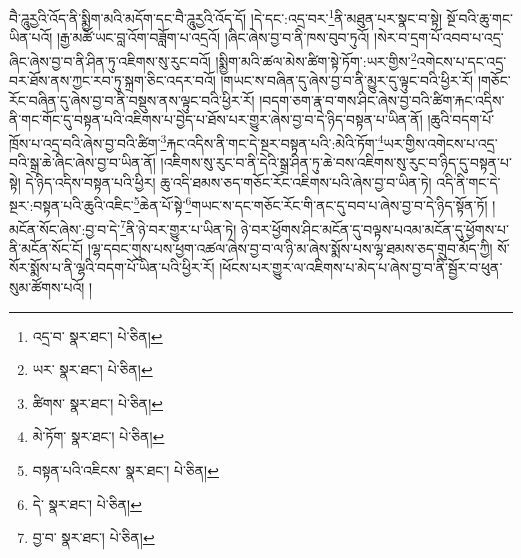 བཻ་ཌཱུརྱའི་འོད་ནི་སྨྱིག་མའི་མདོག་དང་བཻ་ཌཱུརྱའི་འོད་དོ། །དེ་དང་:འདྲ་བར་\footnote{འདྲ་བ་  སྣར་ཐང་།  པེ་ཅིན། }ནི་མཐུན་པར་སྣང་བ་སྟེ། སྔོ་བའི་ཆུ་གང་ཡིན་པའོ། །རྒྱ་མཚོ་ཡང་བླ་འོག་བཟློག་པ་འདྲའོ། །ཞིང་ཞེས་བྱ་བ་ནི་ཁས་བུབ་ཏུའོ། །སེར་བ་དྲག་པོ་འབབ་པ་འདྲ་ཞིང་ཞེས་བྱ་བ་ནི་ཤིན་ཏུ་འཇིགས་སུ་རུང་བའོ། །སྨྱིག་མའི་ཚལ་མེས་ཚིག་སྟེ་ཏོག་:ཡར་གྱིས་\footnote{ཡར་  སྣར་ཐང་།  པེ་ཅིན། }འགེངས་པ་དང་འདྲ་བར་ཐོས་ནས་ཀྱང་རབ་ཏུ་སྐྲག་ཅིང་འདར་བའོ། །གཡང་ས་བཞིན་དུ་ཞེས་བྱ་བ་ནི་མྱུར་དུ་ལྟུང་བའི་ཕྱིར་རོ། །གཅོང་རོང་བཞིན་དུ་ཞེས་བྱ་བ་ནི་བསྡུས་ནས་ལྟུང་བའི་ཕྱིར་རོ། །བདག་ཅག་རྣ་བ་གས་ཤིང་ཞེས་བྱ་བའི་ཚིག་རྐང་འདིས་ནི་གང་གོང་དུ་བསྟན་པའི་འཇིགས་པ་བྱེད་པ་ཐོས་པར་གྱུར་ཞེས་བྱ་བ་དེ་ཉིད་བསྟན་པ་ཡིན་ནོ། །ཆུའི་བདག་པོ་ཁྲོས་པ་འདྲ་བའི་ཞེས་བྱ་བའི་ཚིག་\footnote{ཚིགས་  སྣར་ཐང་།  པེ་ཅིན། }རྐང་འདིས་ནི་གང་དེ་སྔར་བསྟན་པའི་:མེའི་ཏོག་\footnote{མེ་ཏོག་  སྣར་ཐང་།  པེ་ཅིན། }ཡར་གྱིས་འགེངས་པ་འདྲ་བའི་སྒྲ་ཆེ་ཞིང་ཞེས་བྱ་བ་ཡིན་ནོ། །འཇིགས་སུ་རུང་བ་ནི་དེའི་སྒྲ་ཤིན་ཏུ་ཆེ་བས་འཇིགས་སུ་རུང་བ་ཉིད་དུ་བསྟན་པ་སྟེ། དེ་ཉིད་འདིས་བསྟན་པའི་ཕྱིར། ཆུ་འདི་ཐམས་ཅད་གཅོང་རོང་འཇིགས་པའི་ཞེས་བྱ་བ་ཡིན་ཏེ། འདི་ནི་གང་དེ་སྔར་:བསྟན་པའི་ཆུའི་འཇིང་\footnote{བསྟན་པའི་འཇིངས་  སྣར་ཐང་།  པེ་ཅིན། }ཆེན་པོ་སྟེ་\footnote{དེ་  སྣར་ཐང་།  པེ་ཅིན། }གཡང་ས་དང་གཅོང་རོང་གི་ནང་དུ་བབ་པ་ཞེས་བྱ་བ་དེ་ཉིད་སྟོན་ཏོ། །མངོན་སོང་ཞེས་:བྱ་བ་དེ་\footnote{བྱ་བ་  སྣར་ཐང་།  པེ་ཅིན། }ནི་ཉེ་བར་གྱུར་པ་ཡིན་ཏེ། ཉེ་བར་ཕྱོགས་ཤིང་མངོན་དུ་བལྟས་པའམ་མངོན་དུ་ཕྱོགས་པ་ནི་མངོན་སོང་ངོ། །ལྷ་དབང་གུས་པས་ཕྱག་འཚལ་ཞེས་བྱ་བ་ལ་ཉི་མ་ཞེས་སྨོས་པས་ལྷ་ཐམས་ཅད་གྲུབ་མོད་ཀྱི། སོ་སོར་སྨོས་པ་ནི་ལྷའི་བདག་པོ་ཡིན་པའི་ཕྱིར་རོ། །ཕོངས་པར་གྱུར་ལ་འཇིགས་པ་མེད་པ་ཞེས་བྱ་བ་ནི་སྦྱོར་བ་ཕུན་སུམ་ཚོགས་པའོ། །

